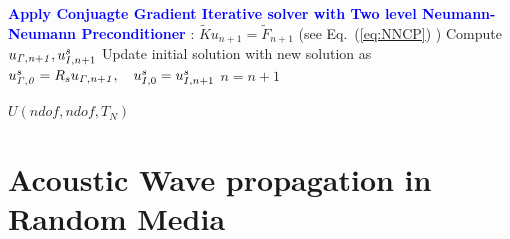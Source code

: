 \documentclass{article}
\begin{document}
\begin{algorithm}
\begin{algorithmic}[1]
 \EndFor
 
 
 \State \textcolor{blue}{\bf{Apply Conjuagte Gradient Iterative solver with Two level Neumann-Neumann Preconditioner}} : $\tilde{K} u_{n+1} = \tilde{F}_{n+1}$ (see Eq.~(\ref{eq:NNCP}) )
 \State Compute $u_{\it{\Gamma},n+1}, u_{I,n+1} ^s$
\State Update initial solution with new solution as $u_{\it{\Gamma},0}^{s} = R_s u_{\it{\Gamma},n+1}, \quad u_{I,0}^{s} = u_{I,n+1}^{s}$
 \State  $n = n + 1$ 
 
 
 \EndWhile

 
  $U(ndof,ndof,T_N)$
\end{algorithmic}
\end{algorithm}

\section{Acoustic Wave propagation in Random Media}\label{sec:acwave_random_c2}
\end{document}
